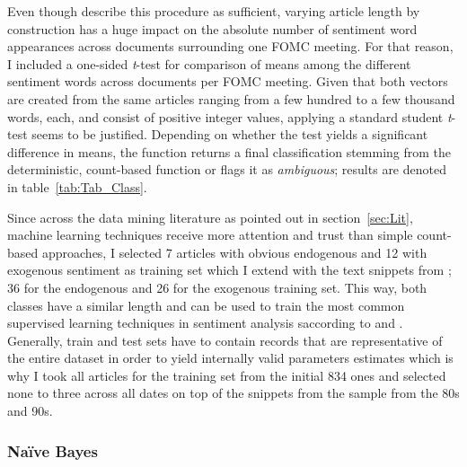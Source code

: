 Even though \textcite{Meyer.2008} describe this procedure as sufficient, varying article length by construction has a huge impact on the absolute number of sentiment word appearances across documents surrounding one FOMC meeting. For that reason, I included a one-sided \textit{t}-test for comparison of means among the different sentiment words across documents per FOMC meeting. Given that both vectors are created from the same articles ranging from a few hundred to a few thousand words, each, and consist of positive integer values, applying a standard student \textit{t}-test seems to be justified. Depending on whether the test yields a significant difference in means, the function returns a final classification stemming from the deterministic, count-based function or flags it as \textit{ambiguous}; results are denoted in table~\vref{tab:Tab_Class}.

Since across the data mining literature as pointed out in section~\ref{sec:Lit}, machine learning techniques receive more attention and trust than simple count-based approaches, I selected 7 articles with obvious endogenous and 12 with exogenous sentiment as training set which I extend with the text snippets from \textcite{Ellingsen.2003}; 36 for the endogenous and 26 for the exogenous training set. This way, both classes have a similar length and can be used to train the most common supervised learning techniques in sentiment analysis saccording to \textcite{Liu.2010} and \textcite{Feldman.2013}. Generally, train and test sets have to contain records that are representative of the entire dataset in order to yield internally valid parameters estimates which is why I took all articles for the training set from the initial 834 ones and selected none to three across all dates on top of the snippets from the \textcite{Ellingsen.2003} sample from the 80s and 90s.

\subsubsection{Na\"{i}ve Bayes} %

